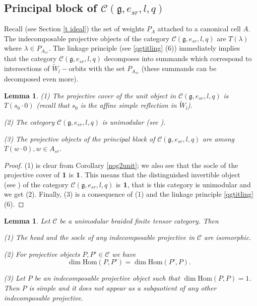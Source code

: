 \documentclass{amsart}
\newtheorem{lemma}[theorem]{Lemma}
\theoremstyle{definition}
\newcommand{\C}{\mathcal{C}}
\newcommand{\g}{\mathfrak{g}}
\newcommand{\Hom}{\mathrm{Hom}}
\newcommand{\be}{{\bf 1}}
\numberwithin{equation}{section}
\begin{document}
\subsection{Principal block of $\C(\g,e_{sr},l,q)$}
Recall (see Section \ref{t ideal}) the set of weights $P_A$ attached to a canonical cell $A$.
The indecomposable projective objects of the category $\C(\g,e_{sr},l,q)$ are $T(\lambda)$ where
$\lambda \in P_{A_{sr}}$. The linkage principle (see \ref{qgtitling} (6)) immediately implies that
the category $\C(\g,e_{sr},l,q)$ decomposes into summands which correspond to intersections
of $\tilde W_l-$orbits with the set $P_{A_{sr}}$ (these summands can be decomposed even more).

\begin{lemma}\label{projsr} 
(1) The projective cover of the unit object in $\C(\g,e_{sr},l,q)$ is
$T(s_0\cdot 0)$ (recall that $s_0$ is the affine simple reflection in $\tilde W_l$). 

(2) The category $\C(\g,e_{sr},l,q)$ is unimodular (see \cite[Definition 6.5.7]{EGNO}).

(3) The projective objects of the principal block of $\C(\g,e_{sr},l,q)$ are among \\
$T(w\cdot 0), w\in A_{sr}$.
\end{lemma}

\begin{proof} (1) is clear from Corollary \ref{nog2unit}; we also see that the socle of the projective cover of $\be$ is $\be$. This means that the distinguished invertible object (see
\cite[Definition 6.4.4]{EGNO}) of the category $\C(\g,e_{sr},l,q)$ is $\be$, that is this
category is unimodular and we get (2). Finally, (3) is a consequence of (1) and the 
linkage principle \ref{qgtitling} (6).
\end{proof}

\begin{lemma}\label{projubf}
    Let $\C$ be a unimodular braided finite tensor category. Then

    (1) The head and the socle of any indecomposable projective in $\C$
are isomorphic.

(2) For projective objects $P,P'\in \C$ we have
$$\dim \Hom(P,P')=\dim \Hom(P',P).$$

(3) Let $P$ be an indecomposable projective object such that $\dim \Hom(P,P)=1$.
Then $P$ is simple and it does not appear as a subquotient of any other indecomposable
projective.
\end{lemma}
\end{document}
